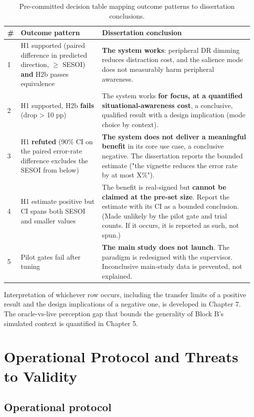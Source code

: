 \begin{longtable}{p{}|p{}|p{}}
\caption{Pre-committed decision table mapping outcome patterns to dissertation conclusions.}\\
\hline
\textbf{\#} & \textbf{Outcome pattern} & \textbf{Dissertation conclusion} \\
\hline
\endhead
\hline
1 & H1 supported (paired difference in predicted direction, $\geq$ SESOI) \textbf{and} H2b passes equivalence & \textbf{The system works}: peripheral DR dimming reduces distraction cost, and the salience mode does not measurably harm peripheral awareness. \\
2 & H1 supported, H2b \textbf{fails} (drop > 10 pp) & The system works \textbf{for focus, at a quantified situational-awareness cost}, a conclusive, qualified result with a design implication (mode choice by context). \\
3 & H1 \textbf{refuted} (90\% CI on the paired error-rate difference excludes the SESOI from below) & \textbf{The system does not deliver a meaningful benefit} in its core use case, a conclusive negative. The dissertation reports the bounded estimate ("the vignette reduces the error rate by at most X\%"). \\
4 & H1 estimate positive but CI spans both SESOI and smaller values & The benefit is real-signed but \textbf{cannot be claimed at the pre-set size}. Report the estimate with its CI as a bounded conclusion. (Made unlikely by the pilot gate and trial counts. If it occurs, it is reported as such, not spun.) \\
5 & Pilot gates fail after tuning & \textbf{The main study does not launch}. The paradigm is redesigned with the supervisor. Inconclusive main-study data is prevented, not explained. \\
\hline
\end{longtable}

Interpretation of whichever row occurs, including the transfer limits of a positive result and the
design implications of a negative one, is developed in Chapter 7. The oracle-vs-live perception gap
that bounds the generality of Block B's simulated context is quantified in Chapter 5.

\section{Operational Protocol and Threats to Validity}

\subsection{Operational protocol}

